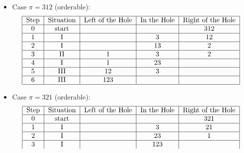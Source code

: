 \documentclass[10pt]{article}
\begin{document}
\begin{enumerate}
\begin{enumerate}
\begin{itemize}
\begin{itemize}
\begin{align*}
                    \end{align*}
                    \item Case $\pi = 312$ (orderable):
                    \begin{align*}
                        \begin{tabular}{|c|c|c|c|c|}
                            \hline
                             \text{Step}& \text{Situation} & \text{Left of the Hole} & \text{In the Hole} & \text{Right of the Hole}\\
                             \hline
                             0& \text{start} &  &  & 312\\
                             \hline
                             1& \text{I} &  & 3 & 12\\
                             \hline
                             2& \text{I} & & 13 & 2\\
                             \hline
                             3& \text{II} & 1 & 3 & 2\\
                             \hline
                             4& \text{I} & 1 & 23  & \\
                             \hline
                             5& \text{III} & 12 & 3 & \\
                             \hline
                             6& \text{III} & 123 &  & \\
                             \hline
                        \end{tabular}
                    \end{align*}
                    \item Case $\pi = 321$ (orderable):
                    \begin{align*}
                        \begin{tabular}{|c|c|c|c|c|}
                            \hline
                             \text{Step}& \text{Situation} & \text{Left of the Hole} & \text{In the Hole} & \text{Right of the Hole}\\
                             \hline
                             0& \text{start} &  &  & 321\\
                             \hline
                             1& \text{I} &  & 3 & 21\\
                             \hline
                             2& \text{I} & & 23 & 1\\
                             \hline
                             3& \text{I} &  & 123 & \\

\end{tabular}
\end{align*}
\end{itemize}
\end{itemize}
\end{enumerate}
\end{enumerate}
\end{document}
